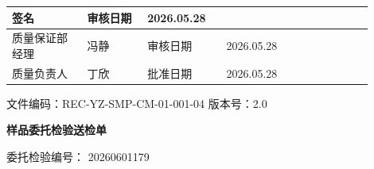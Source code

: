 \documentclass[UTF8,10pt,a4paper,fontset=fandol]{ctexart}
\newcommand{\fieldvalue}[1]{#1}
\newcommand{\handwritten}[1]{#1}
\begin{document}
\begin{tabular}{|p{0.20\linewidth}|p{0.16\linewidth}|p{0.21\linewidth}|p{0.11\linewidth}|p{0.22\linewidth}|}
\fieldvalue{\handwritten{签名}}
&
审核日期
&
\fieldvalue{\handwritten{2026.05.28}}
\\
\hline
质量保证部经理
&
\fieldvalue{\handwritten{冯静}}
&
审核日期
&
\fieldvalue{\handwritten{2026.05.28}}
\\
\hline
质量负责人
&
\fieldvalue{\handwritten{丁欣}}
&
批准日期
&
\fieldvalue{\handwritten{2026.05.28}}
\\
\hline
\end{tabular}

\newpage


\begin{flushright}
文件编码：REC-YZ-SMP-CM-01-001-04 \quad 版本号：2.0
\end{flushright}

\begin{center}
\textbf{\Large 样品委托检验送检单}
\end{center}

委托检验编号：
\fieldvalue{20260601179}

\vspace{0.5em}
\end{document}
